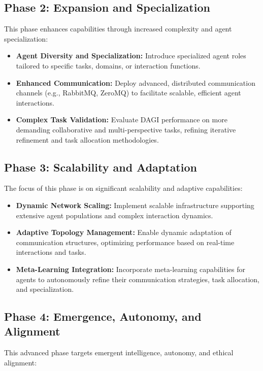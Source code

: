 \documentclass[12pt]{amsart}
\begin{document}
\subsection{Phase 2: Expansion and Specialization}

This phase enhances capabilities through increased complexity and agent specialization:

\begin{itemize}
    \item \textbf{Agent Diversity and Specialization:} Introduce specialized agent roles tailored to specific tasks, domains, or interaction functions.
    \item \textbf{Enhanced Communication:} Deploy advanced, distributed communication channels (e.g., RabbitMQ, ZeroMQ) to facilitate scalable, efficient agent interactions.
    \item \textbf{Complex Task Validation:} Evaluate DAGI performance on more demanding collaborative and multi-perspective tasks, refining iterative refinement and task allocation methodologies.
\end{itemize}

\subsection{Phase 3: Scalability and Adaptation}

The focus of this phase is on significant scalability and adaptive capabilities:

\begin{itemize}
    \item \textbf{Dynamic Network Scaling:} Implement scalable infrastructure supporting extensive agent populations and complex interaction dynamics.
    \item \textbf{Adaptive Topology Management:} Enable dynamic adaptation of communication structures, optimizing performance based on real-time interactions and tasks.
    \item \textbf{Meta-Learning Integration:} Incorporate meta-learning capabilities for agents to autonomously refine their communication strategies, task allocation, and specialization.
\end{itemize}

\subsection{Phase 4: Emergence, Autonomy, and Alignment}

This advanced phase targets emergent intelligence, autonomy, and ethical alignment:
\end{document}
